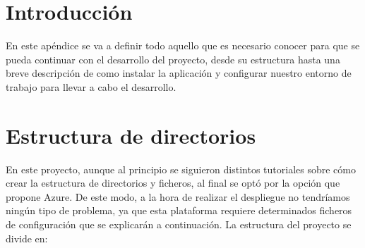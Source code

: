 


\section{Introducción}
En este apéndice se va a definir todo aquello que es necesario conocer para que se pueda continuar con el desarrollo del proyecto, desde su estructura hasta una breve descripción de como instalar la aplicación y configurar nuestro entorno de trabajo para llevar a cabo el desarrollo.

\section{Estructura de directorios}\label{cap:Estructura}
En este proyecto, aunque al principio se siguieron distintos tutoriales sobre cómo crear la estructura de directorios y ficheros, al final se optó por la opción que propone Azure. De este modo, a la hora de realizar el despliegue no tendríamos ningún tipo de problema, ya que esta plataforma requiere determinados ficheros de configuración que se explicarán a continuación.
La estructura del proyecto se divide en:



